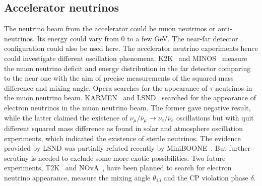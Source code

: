 \subsection{Accelerator  neutrinos}
\label{sec:acce}
The neutrino beam from the accelerator could be muon neutrinos or anti-neutrinos. Its energy could vary from 0 to a few GeV. The near-far detector configuration could also be used here. The accelerator neutrino experiments hence could investigate different oscillation phenomena. K2K~\cite{K2K06} and MINOS~\cite{Min06} measure the muon neutrino deficit and energy distribution in the far detector comparing to the near one with the aim of precise measurements of the squared mass difference and mixing angle. Opera searches for the appearance of $\tau$ neutrinos in the muon neutrino beam. KARMEN~\cite{Kar03} and LSND~\cite{Dod06} searched for the appearance of electron neutrinos in the muon neutrino beam. The former gave negative result, while the latter claimed the existence of $\nu_{\mu}/\bar{\nu}_{\mu} \rightarrow \nu_{e}/\bar{\nu}_{e}$ oscillations but with quit different squared mass difference as found in solar and atmosphere oscillation experiments, which indicated the existence of sterile neutrinos. The evidence provided by LSND was partially refuted recently by MiniBOONE~\cite{Agu07}. But further scrutiny is needed to exclude some more exotic possibilities. Two future experiments, T2K~\cite{T2K05} and NOvA~\cite{Nov05}, have been planned to search for electron neutrino appearance, measure the mixing angle $\theta_{13}$ and the CP violation phase $\delta$.

